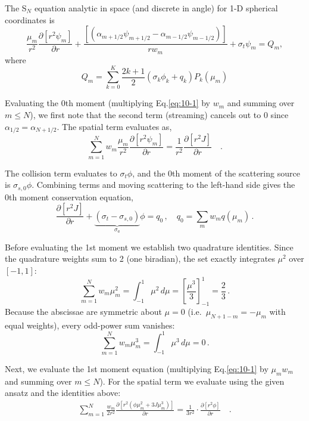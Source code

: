 \begin{mybox}
  The S$_N$ equation analytic in space (and discrete in angle) for 1-D spherical coordinates is
  \begin{equation}
    \frac{\mu_m}{r^2}\frac{\partial[r^2\psi_m]}{\partial r} + \frac{[(\alpha_{m+1/2}\psi_{m+1/2} -\alpha_{m-1/2}\psi_{m-1/2})]}{r w_m} + \sigma_{t}\psi_m = Q_m \label{eq:10-1},
  \end{equation}
  where
  \begin{equation}
    Q_m = \sum_{k=0}^K \frac{2k+1}{2}(\sigma_k\phi_k + q_k)P_k(\mu_m)
  \end{equation}


  Evaluating the 0th moment (multiplying Eq.\eqref{eq:10-1} by $w_m$ and summing over $m\le N$), we first note that the second term (streaming) cancels out to 0 since $\alpha_{1/2} = \alpha_{N+1/2}$. The spatial term evaluates as,
  \begin{equation}
    \sum_{m=1}^N w_m\frac{\mu_m}{r^2}\frac{\partial[r^2\psi_m]}{\partial r} = \frac{1}{r^2}\frac{\partial[r^2 J]}{\partial r}\quad .
  \end{equation}
  
  The collision term evaluates to $\sigma_t\phi$, and the 0th moment of the scattering source is $\sigma_{s,0}\phi$. Combining terms and moving scattering to the left-hand side gives the 0th moment conservation equation,
  \begin{equation}
    \frac{\partial[r^2 J]}{\partial r} + \underbrace{(\sigma_t - \sigma_{s,0})}_{\sigma_a}\phi = q_0\,, \quad q_0 = \sum_m w_m q(\mu_m)\,.\label{eq:10-2}
  \end{equation}

  Before evaluating the 1st moment we establish two quadrature identities. Since the quadrature weights sum to 2 (one biradian), the set exactly integrates $\mu^2$ over $[-1,1]$:
  \begin{equation*}
    \sum_{m=1}^N w_m \mu_m^2 = \int_{-1}^{1} \mu^2\,d\mu = \left[\frac{\mu^3}{3}\right]_{-1}^{1} = \frac{2}{3}\,.
  \end{equation*}
  Because the abscissae are symmetric about $\mu=0$ (i.e.\ $\mu_{N+1-m} = -\mu_m$ with equal weights), every odd-power sum vanishes:
  \begin{equation*}
    \sum_{m=1}^N w_m \mu_m^3 = \int_{-1}^{1} \mu^3\,d\mu = 0\,.
  \end{equation*}

  Next, we evaluate the 1st moment equation (multiplying Eq.\eqref{eq:10-1} by $\mu_m w_m$ and summing over $m\le N$). For the spatial term we evaluate using the given ansatz and the identities above:
  \begin{align*}
    \sum_{m=1}^N \frac{w_m}{2r^2}\frac{\partial[r^2(\phi\mu_m^2 + 3J\mu_m^3)]}{\partial r} = \frac{1}{3r^2}\cdot \frac{\partial[r^2\phi]}{\partial r}\quad .
  \end{align*}


\end{mybox}
